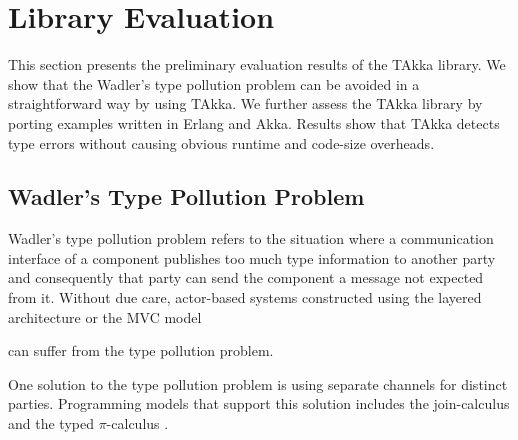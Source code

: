 


\section{Library Evaluation}

This section presents the preliminary evaluation results of the TAkka library.  
We show that the Wadler's type pollution problem can be avoided 
in a straightforward way by using TAkka. We further assess the TAkka library by 
porting examples written in Erlang and Akka.  Results show that TAkka 
detects type errors without causing obvious runtime and code-size overheads.



\subsection{Wadler\rq{}s Type Pollution Problem}
\label{type_pollution}

Wadler\rq{}s type pollution problem refers to the situation where a
communication interface of a component publishes too much type information to 
another party and consequently that party can send the component a message not
expected from it.  Without due care, actor-based systems constructed using the
layered architecture or the MVC model  
can suffer from the type pollution problem.

One solution to the type pollution problem is using separate channels for
distinct parties.  Programming models that support this solution includes the
join-calculus \cite{full_join} and the typed $\pi$-calculus \cite{pi_book}.


